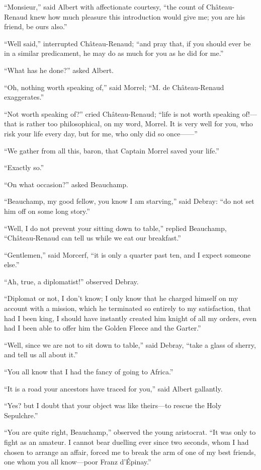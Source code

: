 “Monsieur,” said Albert with affectionate courtesy, “the count of
Château-Renaud knew how much pleasure this introduction would give me;
you are his friend, be ours also.”

“Well said,” interrupted Château-Renaud; “and pray that, if you should
ever be in a similar predicament, he may do as much for you as he did
for me.”

“What has he done?” asked Albert.

“Oh, nothing worth speaking of,” said Morrel; “M. de Château-Renaud
exaggerates.”

“Not worth speaking of?” cried Château-Renaud; “life is not worth
speaking of!—that is rather too philosophical, on my word, Morrel. It
is very well for you, who risk your life every day, but for me, who
only did so once——”

“We gather from all this, baron, that Captain Morrel saved your life.”

“Exactly so.”

“On what occasion?” asked Beauchamp.

“Beauchamp, my good fellow, you know I am starving,” said Debray: “do
not set him off on some long story.”

“Well, I do not prevent your sitting down to table,” replied Beauchamp,
“Château-Renaud can tell us while we eat our breakfast.”

“Gentlemen,” said Morcerf, “it is only a quarter past ten, and I expect
someone else.”

“Ah, true, a diplomatist!” observed Debray.

“Diplomat or not, I don’t know; I only know that he charged himself on
my account with a mission, which he terminated so entirely to my
satisfaction, that had I been king, I should have instantly created him
knight of all my orders, even had I been able to offer him the Golden
Fleece and the Garter.”

“Well, since we are not to sit down to table,” said Debray, “take a
glass of sherry, and tell us all about it.”

“You all know that I had the fancy of going to Africa.”

“It is a road your ancestors have traced for you,” said Albert
gallantly.

“Yes? but I doubt that your object was like theirs—to rescue the Holy
Sepulchre.”

“You are quite right, Beauchamp,” observed the young aristocrat. “It
was only to fight as an amateur. I cannot bear duelling ever since two
seconds, whom I had chosen to arrange an affair, forced me to break the
arm of one of my best friends, one whom you all know—poor Franz
d’Épinay.”

